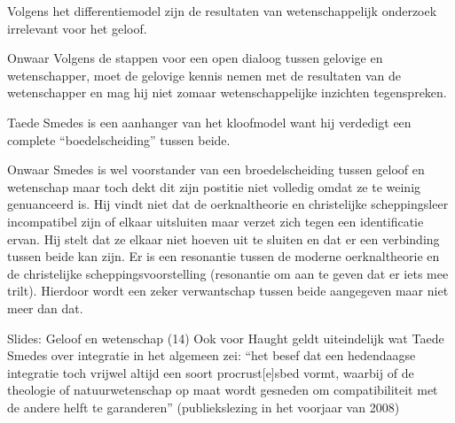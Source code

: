 \documentclass[main.tex]{subfiles}
\begin{document}
\begin{examenvraag}
    \begin{stelling}
        Volgens het differentiemodel zijn de resultaten van wetenschappelijk onderzoek irrelevant voor het geloof.
    \end{stelling}

    \begin{stelling-antwoord}{Onwaar}
    	Volgens de stappen voor een open dialoog tussen gelovige en wetenschapper, moet de gelovige kennis nemen met de resultaten van de wetenschapper en mag hij niet zomaar wetenschappelijke inzichten tegenspreken.
  	\end{stelling-antwoord}
\end{examenvraag}


\begin{examenvraag}
    \begin{stelling}
        Taede Smedes is een aanhanger van het kloofmodel want hij verdedigt een complete “boedelscheiding” tussen beide.
    \end{stelling}

	\begin{stelling-antwoord}{Onwaar}
	Smedes is wel voorstander van een broedelscheiding tussen geloof en 
	wetenschap‭ ‬maar toch dekt dit zijn postitie niet volledig omdat ze te 
	weinig genuanceerd is.‭ ‬Hij vindt niet dat de oerknaltheorie en 
	christelijke scheppingsleer incompatibel zijn of elkaar uitsluiten maar 
	verzet zich tegen een identificatie ervan.‭ ‬Hij stelt dat ze elkaar niet‭ 
	‬hoeven uit te sluiten en dat er een verbinding tussen beide‭ ‬kan zijn.‭ ‬Er 
	is een resonantie tussen de moderne oerknaltheorie en de christelijke 
	scheppingsvoorstelling‭ (‬resonantie om aan te geven dat er iets mee 
	trilt‭)‬.‭ ‬Hierdoor wordt een zeker verwantschap tussen beide aangegeven 
	maar niet meer dan dat.
    	
    	\begin{citaat}{Slides: Geloof en wetenschap (14)}
    	Ook voor Haught geldt uiteindelijk wat Taede Smedes
		over integratie in het algemeen zei: “het besef dat een
		hedendaagse integratie toch vrijwel altijd een soort
		procrust[e]sbed vormt, waarbij of de theologie of
		natuurwetenschap op maat wordt gesneden om
		compatibiliteit met de andere helft te garanderen”
		(publiekslezing in het voorjaar van 2008)
    	\end{citaat}
  	\end{stelling-antwoord}

\end{examenvraag}
\end{document}
